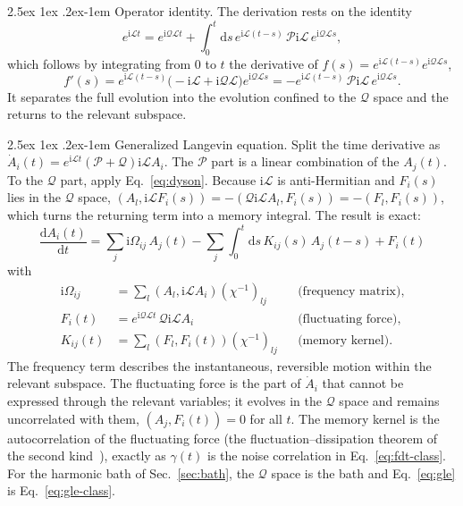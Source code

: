 \documentclass[10pt,a4paper]{article}
\makeatletter
\renewcommand{\paragraph}{\@startsection{paragraph}{4}{\z@}%
  {2.5ex \@plus 1ex \@minus .2ex}{-1em}%
  {\normalfont\fontsize{14pt}{17pt}\selectfont\bfseries}}
\newcommand{\dd}{\mathrm{d}}
\newcommand{\ii}{\mathrm{i}}
\newcommand{\sprod}[2]{\left(#1 , #2\right)}
\newcommand{\LL}{\mathcal{L}}
\newcommand{\PP}{\mathcal{P}}
\newcommand{\QQ}{\mathcal{Q}}
\makeatother
\begin{document}
\paragraph{Operator identity.}
The derivation rests on the identity
\begin{equation}
  e^{\ii\LL t} = e^{\ii\QQ\LL t} + \int_0^t \dd s \, e^{\ii\LL(t-s)} \, \PP \ii\LL \, e^{\ii\QQ\LL s} ,
  \label{eq:dyson}
\end{equation}
which follows by integrating from $ 0 $ to $ t $ the derivative of $ f(s) = e^{\ii\LL(t-s)} e^{\ii\QQ\LL s} $,
\begin{equation*}
  f'(s) = e^{\ii\LL(t-s)} \big( -\ii\LL + \ii\QQ\LL \big) e^{\ii\QQ\LL s} = -e^{\ii\LL(t-s)} \, \PP \ii\LL \, e^{\ii\QQ\LL s} .
\end{equation*}
It separates the full evolution into the evolution confined to the $ \QQ $ space and the returns to the relevant subspace.

\paragraph{Generalized Langevin equation.}
Split the time derivative as $ \dot A_i(t) = e^{\ii\LL t} (\PP + \QQ) \ii\LL A_i $.
The $ \PP $ part is a linear combination of the $ A_j(t) $.
To the $ \QQ $ part, apply Eq.~\eqref{eq:dyson}.
Because $ \ii\LL $ is anti-Hermitian and $ F_i(s) $ lies in the $ \QQ $ space, $ \sprod{A_l}{\ii\LL F_i(s)} = -\sprod{\QQ\ii\LL A_l}{F_i(s)} = -\sprod{F_l}{F_i(s)} $, which turns the returning term into a memory integral.
The result is exact:
\begin{equation}
  \boxed{
  \frac{\dd A_i(t)}{\dd t}
  = \sum_j \ii\Omega_{ij} \, A_j(t)
  - \sum_j \int_0^t \dd s \, K_{ij}(s) \, A_j(t-s)
  + F_i(t)
  }
  \label{eq:gle}
\end{equation}
with
\begin{align}
  \ii\Omega_{ij} &= \sum_l \sprod{A_l}{\ii\LL A_i} (\chi^{-1})_{lj}
  && \text{(frequency matrix)},
  \label{eq:omega}\\
  F_i(t) &= e^{\ii\QQ\LL t} \, \QQ \ii\LL A_i
  && \text{(fluctuating force)},
  \label{eq:force}\\
  K_{ij}(t) &= \sum_l \sprod{F_l}{F_i(t)} (\chi^{-1})_{lj}
  && \text{(memory kernel)}.
  \label{eq:kernel}
\end{align}
The frequency term describes the instantaneous, reversible motion within the relevant subspace.
The fluctuating force is the part of $ \dot A_i $ that cannot be expressed through the relevant variables; it evolves in the $ \QQ $ space and remains uncorrelated with them, $ \sprod{A_j}{F_i(t)} = 0 $ for all $ t $.
The memory kernel is the autocorrelation of the fluctuating force (the fluctuation--dissipation theorem of the second kind~\cite{Kubo1966}), exactly as $ \gamma(t) $ is the noise correlation in Eq.~\eqref{eq:fdt-class}.
For the harmonic bath of Sec.~\ref{sec:bath}, the $ \QQ $ space is the bath and Eq.~\eqref{eq:gle} is Eq.~\eqref{eq:gle-class}.
\end{document}

